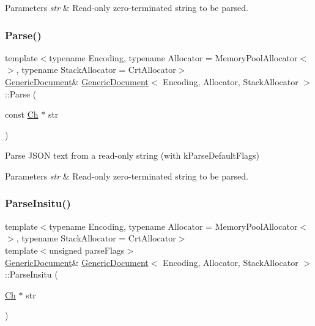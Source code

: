 \begin{DoxyParams}{Parameters}
{\em str} & Read-\/only zero-\/terminated string to be parsed. \\
\hline
\end{DoxyParams}
\mbox{\label{classGenericDocument_a49ae6de6fd0bc820d9864a106c10b4da}} 
\subsubsection{\texorpdfstring{Parse()}{Parse()}\hspace{0.1cm}{\footnotesize\ttfamily [6/6]}}
{\footnotesize\ttfamily template$<$typename Encoding, typename Allocator = Memory\+Pool\+Allocator$<$$>$, typename Stack\+Allocator = Crt\+Allocator$>$ \\
\hyperlink{classGenericDocument}{Generic\+Document}\& \hyperlink{classGenericDocument}{Generic\+Document}$<$ Encoding, Allocator, Stack\+Allocator $>$\+::Parse (\begin{DoxyParamCaption}\item[{const \hyperlink{classGenericValue_ade0e0ce64ccd5d852da57a35e720bafb}{Ch} $\ast$}]{str }\end{DoxyParamCaption})\hspace{0.3cm}{\ttfamily [inline]}}



Parse J\+S\+ON text from a read-\/only string (with k\+Parse\+Default\+Flags) 


\begin{DoxyParams}{Parameters}
{\em str} & Read-\/only zero-\/terminated string to be parsed. \\
\hline
\end{DoxyParams}
\mbox{\label{classGenericDocument_a301f8f297a5a0da4b6be5459ad766f75}} 
\subsubsection{\texorpdfstring{Parse\+Insitu()}{ParseInsitu()}\hspace{0.1cm}{\footnotesize\ttfamily [1/4]}}
{\footnotesize\ttfamily template$<$typename Encoding, typename Allocator = Memory\+Pool\+Allocator$<$$>$, typename Stack\+Allocator = Crt\+Allocator$>$ \\
template$<$unsigned parse\+Flags$>$ \\
\hyperlink{classGenericDocument}{Generic\+Document}\& \hyperlink{classGenericDocument}{Generic\+Document}$<$ Encoding, Allocator, Stack\+Allocator $>$\+::Parse\+Insitu (\begin{DoxyParamCaption}\item[{\hyperlink{classGenericValue_ade0e0ce64ccd5d852da57a35e720bafb}{Ch} $\ast$}]{str }\end{DoxyParamCaption})\hspace{0.3cm}{\ttfamily [inline]}}



